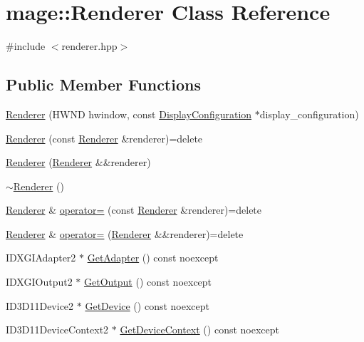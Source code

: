\hypertarget{classmage_1_1_renderer}{}\section{mage\+:\+:Renderer Class Reference}
\label{classmage_1_1_renderer}


{\ttfamily \#include $<$renderer.\+hpp$>$}

\subsection*{Public Member Functions}
\begin{DoxyCompactItemize}
\item 
\hyperlink{classmage_1_1_renderer_a63948f43587e63f5caafa2260e9dfc52}{Renderer} (H\+W\+ND hwindow, const \hyperlink{structmage_1_1_display_configuration}{Display\+Configuration} $\ast$display\+\_\+configuration)
\item 
\hyperlink{classmage_1_1_renderer_acd6b509da2bd7e7d764b45b912fe5298}{Renderer} (const \hyperlink{classmage_1_1_renderer}{Renderer} \&renderer)=delete
\item 
\hyperlink{classmage_1_1_renderer_a24a9346ca7aed427b49d0e4ed4984da3}{Renderer} (\hyperlink{classmage_1_1_renderer}{Renderer} \&\&renderer)
\item 
\hyperlink{classmage_1_1_renderer_a997e041f28cc71d069d1ab7d29fe6ced}{$\sim$\+Renderer} ()
\item 
\hyperlink{classmage_1_1_renderer}{Renderer} \& \hyperlink{classmage_1_1_renderer_a2762ead5f771ae95e4293cd7eb1a2834}{operator=} (const \hyperlink{classmage_1_1_renderer}{Renderer} \&renderer)=delete
\item 
\hyperlink{classmage_1_1_renderer}{Renderer} \& \hyperlink{classmage_1_1_renderer_aa381bb89bffdc8ea2d8e3625e28cd28a}{operator=} (\hyperlink{classmage_1_1_renderer}{Renderer} \&\&renderer)=delete
\item 
I\+D\+X\+G\+I\+Adapter2 $\ast$ \hyperlink{classmage_1_1_renderer_a75fe0cdffda2e282dba1081dfddaa94d}{Get\+Adapter} () const noexcept
\item 
I\+D\+X\+G\+I\+Output2 $\ast$ \hyperlink{classmage_1_1_renderer_a6f19510d91cb5dd71c41fde26db9aeaa}{Get\+Output} () const noexcept
\item 
I\+D3\+D11\+Device2 $\ast$ \hyperlink{classmage_1_1_renderer_a9510b8784447ed0fa9b43e7a4bf1fc80}{Get\+Device} () const noexcept
\item 
I\+D3\+D11\+Device\+Context2 $\ast$ \hyperlink{classmage_1_1_renderer_a13df5f31b3d18d2f4428743ebd7ffbe5}{Get\+Device\+Context} () const noexcept

\end{DoxyCompactItemize}

